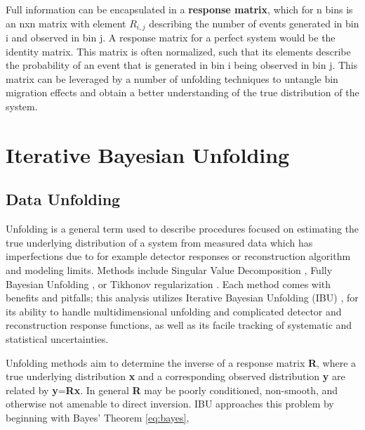     

    Full information can be encapsulated in a \textbf{response matrix}, which for n bins is an nxn matrix with element $R_{i,j}$ describing the number of events generated in bin i and observed in bin j. A response matrix for a perfect system would be the identity matrix. This matrix is often normalized, such that its elements describe the probability of an event that is generated in bin i being observed in bin j. This matrix can be leveraged by a number of unfolding techniques to untangle bin migration effects and obtain a better understanding of the true distribution of the system. 


 \clearpage

\section{Iterative Bayesian Unfolding}

    \subsection{Data Unfolding}

        Unfolding is a general term used to describe procedures focused on estimating the true underlying distribution of a system from measured data which has imperfections due to for example detector responses or reconstruction algorithm and modeling limits. Methods include Singular Value Decomposition \parencite{Klema1980TheApplications}, Fully Bayesian Unfolding \cite{Choudalakis2012FullyUnfolding}, or Tikhonov regularization \parencite{Hoerl1970RidgeProblems}. Each method comes with benefits and pitfalls; this analysis utilizes Iterative Bayesian Unfolding (IBU) \parencite{DAgostini1995ATheorem}, \parencite{DAgostini2010ImprovedUnfolding} for its ability to handle multidimensional unfolding and complicated detector and reconstruction response functions, as well as its facile tracking of systematic and statistical uncertainties. 

        Unfolding methods aim to determine the inverse of a response matrix \textbf{R}, where a true underlying distribution \textbf{x} and a corresponding observed distribution \textbf{y} are related by \textbf{y}=\textbf{Rx}. In general \textbf{R} may be poorly conditioned, non-smooth, and otherwise not amenable to direct inversion. IBU approaches this problem by beginning with Bayes' Theorem \eqref{eq:bayes},

